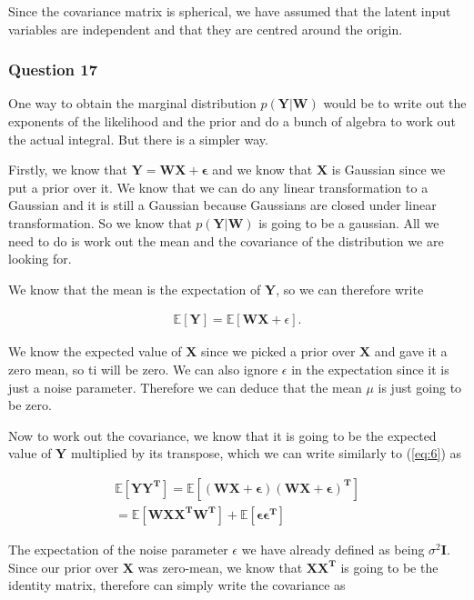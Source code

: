 \documentclass[10pt, a4paper, twocolumn]{article} %
\begin{document}
Since the covariance matrix is spherical, we have assumed that the latent input variables are independent and that they are centred around the origin. 

\subsubsection*{Question 17}

One way to obtain the marginal distribution $p(\mathbf{Y|W})$ would be to write out the exponents of the likelihood and the prior and do a bunch of algebra to work out the actual integral. But there is a simpler way.

Firstly, we know that $\mathbf{Y = WX + \epsilon}$ and we know that $\mathbf{X}$ is Gaussian since we put a prior over it. We know that we can do any linear transformation to a Gaussian and it is still a Gaussian because Gaussians are closed under linear transformation. So we know that $p(\mathbf{Y|W})$ is going to be a gaussian. All we need to do is work out the mean and the covariance of the distribution we are looking for.

We know that the mean is the expectation of $\mathbf{Y}$, so we can therefore write

\begin{align} \label{eq:6}
  \mathbb{E}[\mathbf{Y}] = \mathbb{E}[\mathbf{WX} + \epsilon].
\end{align}

We know the expected value of $\mathbf{X}$ since we picked a prior over $\mathbf{X}$ and gave it a zero mean, so ti will be zero. We can also ignore $\epsilon$ in the expectation since it is just a noise parameter. Therefore we can deduce that the mean $\mu$ is just going to be zero.

Now to work out the covariance, we know that it is going to be the expected value of $\mathbf{Y}$ multiplied by its transpose, which we can write similarly to (\ref{eq:6}) as

\begin{align}
  \mathbb{E}[\mathbf{YY^T}] = \mathbb{E}[\mathbf{(WX + \epsilon)(WX + \epsilon)^T}] \\
  = \mathbb{E}[\mathbf{WXX^TW^T}] + \mathbb{E}[\mathbf{\epsilon\epsilon^T}]
\end{align}

The expectation of the noise parameter $\epsilon$ we have already defined as being $\sigma^2\mathbf{I}$. Since our prior over $\mathbf{X}$ was zero-mean, we know that $\mathbf{XX^T}$ is going to be the identity matrix, therefore can simply write the covariance as
\end{document}
